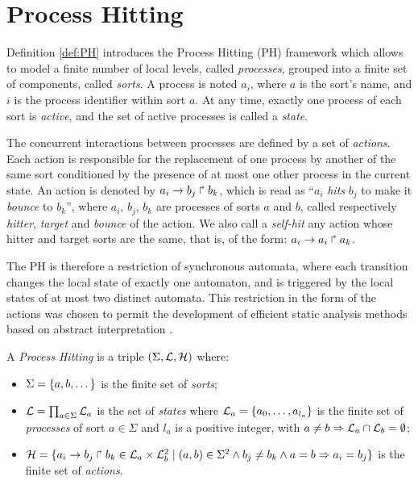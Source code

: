 

\section{Process Hitting}
\label{sec:ph}

Definition \ref{def:PH} introduces the Process Hitting (PH) framework \cite{PMR10-TCSB}
which allows to model a finite number of local levels,
called \emph{processes},
grouped into a finite set of components, called \emph{sorts}.
A process is noted $a_i$, where $a$ is the sort's name,
and $i$ is the process identifier within sort $a$.
At any time, exactly one process of each sort is \emph{active},
and the set of active processes is called a \emph{state}.

The concurrent interactions between processes are defined by a set of \emph{actions}.
Each action is responsible for the replacement of one process by another of the same sort
conditioned by the presence of at most one other process in the current state.
An action is denoted by $a_i\rightarrow b_j\Rsh b_k$, which is read as
“$a_i$ \emph{hits} $b_j$ to make it \emph{bounce} to $b_k$”,
where $a_i$, $b_j$, $b_k$ are processes of sorts $a$ and $b$,
called respectively \emph{hitter}, \emph{target} and
\emph{bounce} of the action.
We also call a \emph{self-hit} any action whose hitter and target sorts are the same,
that is, of the form: $a_i\rightarrow a_i\Rsh a_k$.

The PH is therefore a restriction of synchronous automata, where each transition
changes the local state of exactly one automaton,
and is triggered by the local states of at most two distinct automata.
This restriction in the form of the actions was chosen to permit
the development of efficient static analysis methods
based on abstract interpretation \cite{PMR12-MSCS}.

\begin{definition}\label{def:PH}
  A \emph{Process Hitting} is a triple $(\Sigma,\mathcal{L},\mathcal{H})$ where:
  \begin{itemize}
    \item  $\Sigma = \{a,b,\dots\}$ is the finite set of \emph{sorts};
    \item  $\mathcal{L} = \prod_{a\in\Sigma} \mathcal{L}_a$ is the set of \emph{states} where
      $\mathcal{L}_a = \{a_0,\dots,a_{l_a}\}$
      is the finite set of \emph{processes} of sort $a\in\Sigma$
      and $l_a$ is a positive integer, with $a\neq b\Rightarrow \mathcal{L}_a \cap \mathcal{L}_b = \emptyset$;
    \item  $\mathcal{H} = \{ a_i\rightarrow b_j\Rsh b_k \in \mathcal{L}_a \times \mathcal{L}_b^2 \mid
      (a,b) \in \Sigma^2 \wedge b_j\neq b_k \wedge a=b\Rightarrow a_i=b_j\}$
      is the finite set of \emph{actions}.
  \end{itemize}
\end{definition}

